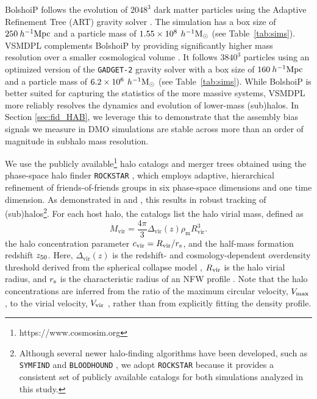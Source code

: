 \documentclass[twocolumn,apj,numberedappendix,twocolappendix,iop]{openjournal}
\begin{document}
BolshoiP follows the evolution of $2048^3$ dark matter particles using the Adaptive Refinement Tree (ART) gravity solver \citep{Kravtsov.etal.97}. The simulation has a box size of $250 \>h^{-1}{\rm {Mpc}}$ and a particle mass of $1.55\times10^{8}\,\>h^{-1}\rm M_\odot$ (see Table~\ref{tab:sims}). VSMDPL complements BolshoiP by providing significantly higher mass resolution over a smaller cosmological volume \citep{Klypin.etal.16, RodriguezPuebla.etal.16, Behroozi.etal.20}. It follows $3840^3$ particles using an optimized version of the \texttt{GADGET-2} gravity solver \citep{Springel.05} with a box size of $160 \>h^{-1}{\rm {Mpc}}$ and a particle mass of $6.2\times10^{6}\,\>h^{-1}\rm M_\odot$ (see Table~\ref{tab:sims}). While BolshoiP is better suited for capturing the statistics of the more massive systems, VSMDPL more reliably resolves the dynamics and evolution of lower-mass (sub)halos. In Section \ref{sec:fid_HAB}, we leverage this to demonstrate that the assembly bias signals we measure in DMO simulations are stable across more than an order of magnitude in subhalo mass resolution. 

We use the publicly available\footnote{https://www.cosmosim.org} halo catalogs and merger trees obtained using the phase-space halo finder \texttt{ROCKSTAR} \citep{Behroozi.etal.13a, Behroozi.etal.13b}, which employs adaptive, hierarchical refinement of friends-of-friends groups in six phase-space dimensions and one time dimension. As demonstrated in \citet{Knebe.etal.11, Knebe.etal.13} and \citet{Onions.etal.12}, this results in robust tracking of (sub)halos\footnote{Although several newer halo-finding algorithms have been developed, such as \texttt{SYMFIND} \citep{Mansfield.etal.24} and \texttt{BLOODHOUND} \citep{Kong.etal.25}, we adopt \texttt{ROCKSTAR} because it provides a consistent set of publicly available catalogs for both simulations analyzed in this study.}. For each host halo, the catalogs list the halo virial mass, defined as
%
\begin{equation}
    M_{\mathrm{vir}}=\frac{4 \pi}{3} \Delta_{\mathrm{vir}}(z) \rho_{\mathrm{m}} R_{\mathrm{vir}}^3.
    \label{eq:mvir}
\end{equation}
%
the halo concentration parameter $c_{\rm vir} = R_{\rm vir}/r_{\rm s}$, and the half-mass formation redshift $z_{50}$. Here, $\Delta_{\mathrm{vir}}(z)$ is the redshift- and cosmology-dependent overdensity threshold derived from the spherical collapse model \citep{Bryan.Norman.98}, $R_{\rm vir}$ is the halo virial radius, and $r_{\rm s}$  is the characteristic radius of an NFW profile \citep{Navarro.etal.97}. Note that the halo concentrations are inferred from the ratio of the maximum circular velocity, $V_{\rm max}$, to the virial velocity, $V_{\rm vir}$ \citep[][]{Klypin.etal.11, Prada.etal.12}, rather than from explicitly fitting the density profile.
\end{document}
